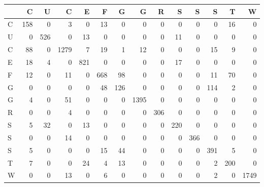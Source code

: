 \begin{tabular}{lrrrrrrrrrrrrr}
\toprule
{} &    C &    U &     C &    E &    F &    G &     G &    R &    S &    S &    S &    T &     W \\
\midrule
C &  158 &    0 &     3 &    0 &   13 &    0 &     0 &    0 &    0 &    0 &    0 &   16 &     0 \\
U &    0 &  526 &     0 &   13 &    0 &    0 &     0 &    0 &   11 &    0 &    0 &    0 &     0 \\
C &   88 &    0 &  1279 &    7 &   19 &    1 &    12 &    0 &    0 &    0 &   15 &    9 &     0 \\
E &   18 &    4 &     0 &  821 &    0 &    0 &     0 &    0 &   17 &    0 &    0 &    0 &     0 \\
F &   12 &    0 &    11 &    0 &  668 &   98 &     0 &    0 &    0 &    0 &   11 &   70 &     0 \\
G &    0 &    0 &     0 &    0 &   48 &  126 &     0 &    0 &    0 &    0 &  114 &    2 &     0 \\
G &    4 &    0 &    51 &    0 &    0 &    0 &  1395 &    0 &    0 &    0 &    0 &    0 &     0 \\
R &    0 &    0 &     4 &    0 &    0 &    0 &     0 &  306 &    0 &    0 &    0 &    0 &     0 \\
S &    5 &   32 &     0 &   13 &    0 &    0 &     0 &    0 &  220 &    0 &    0 &    0 &     0 \\
S &    0 &    0 &    14 &    0 &    0 &    0 &     0 &    0 &    0 &  366 &    0 &    0 &     0 \\
S &    5 &    0 &     0 &    0 &   15 &   44 &     0 &    0 &    0 &    0 &  391 &    5 &     0 \\
T &    7 &    0 &     0 &   24 &    4 &   13 &     0 &    0 &    0 &    0 &    2 &  200 &     0 \\
W &    0 &    0 &    13 &    0 &    6 &    0 &     0 &    0 &    0 &    0 &    2 &    0 &  1749 \\
\bottomrule
\end{tabular}
